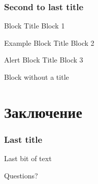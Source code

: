 \documentclass[
    11pt, %
    aspectratio=169, %
]{beamer}
\begin{document}
\begin{frame}
	\frametitle{Second to last title}
    	\begin{block}{Block Title}
    		Block 1
    	\end{block}
    	
    	\begin{exampleblock}{Example Block Title}
    		Block 2
    	\end{exampleblock}
    	
    	\begin{alertblock}{Alert Block Title}
    		Block 3
    	\end{alertblock}
    	
    	\begin{block}{} %
    		Block without a title
    	\end{block}
\end{frame}

\section{Заключение}
\begin{frame}
	\frametitle{Last title}
		
	Last bit of text

\end{frame}


\appendix
{}

\begin{frame}[noframenumbering] %

	\begin{center}
            {\LARGE Questions?}
	\end{center}
 
\end{frame}

\end{document}
